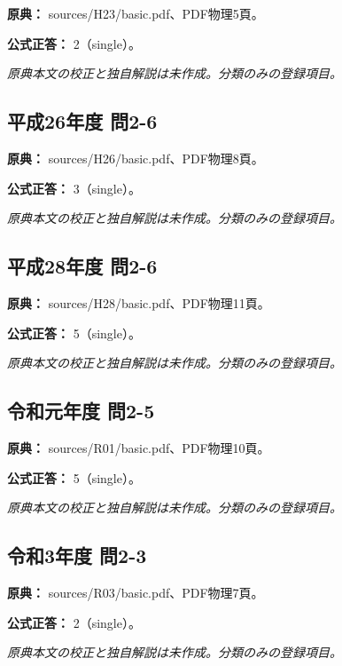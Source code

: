 \noindent\textbf{原典：} sources/H23/basic.pdf、PDF物理5頁。

\textbf{公式正答：} 2（single）。

\par\textit{原典本文の校正と独自解説は未作成。分類のみの登録項目。}

\subsection{平成26年度 問2-6}
\label{q:h26-reg-basic-2-6}

\noindent\textbf{原典：} sources/H26/basic.pdf、PDF物理8頁。

\textbf{公式正答：} 3（single）。

\par\textit{原典本文の校正と独自解説は未作成。分類のみの登録項目。}

\subsection{平成28年度 問2-6}
\label{q:h28-reg-basic-2-6}

\noindent\textbf{原典：} sources/H28/basic.pdf、PDF物理11頁。

\textbf{公式正答：} 5（single）。

\par\textit{原典本文の校正と独自解説は未作成。分類のみの登録項目。}

\subsection{令和元年度 問2-5}
\label{q:r01-reg-basic-2-5}

\noindent\textbf{原典：} sources/R01/basic.pdf、PDF物理10頁。

\textbf{公式正答：} 5（single）。

\par\textit{原典本文の校正と独自解説は未作成。分類のみの登録項目。}

\subsection{令和3年度 問2-3}
\label{q:r03-reg-basic-2-3}

\noindent\textbf{原典：} sources/R03/basic.pdf、PDF物理7頁。

\textbf{公式正答：} 2（single）。

\par\textit{原典本文の校正と独自解説は未作成。分類のみの登録項目。}

